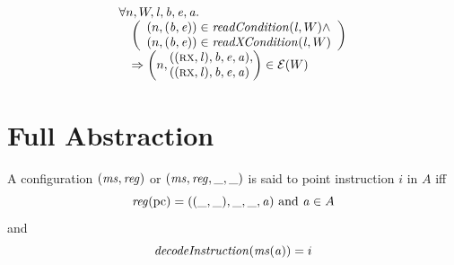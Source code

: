 \documentclass[a4paper]{article}
\begin{document}
\begin{theorem}[FTLR]
  \label{thm:ftlr}
  \[
    \begin{array}{l}
      \forall n,W,\lin,\baddr,\eaddr,\aaddr \ldotp \\
      \quad \left(
      \begin{array}{l}
        \npair{(\baddr,\eaddr)} \in \readCond{\lin,W} \wedge\\
        \npair{(\baddr,\eaddr)} \in \xReadCond{\lin,W}
      \end{array}
      \right)\\
      \quad\Rightarrow 
      \npair{\arraycolsep=0pt\array{l}((\rx,\lin),\baddr,\eaddr,\aaddr),\\
                      ((\rx,\lin),\baddr,\eaddr,\aaddr)\endarray} \in \lre(W)

    \end{array}
  \]
\end{theorem}

\section{Full Abstraction}
\begin{definition}
  \label{def:points-to-instr}
  A configuration $(\mathit{ms},\mathit{reg})$ {\sourcecolor or $(\mathit{ms},\mathit{reg},\_,\_)$} is said to point instruction $i$ in $A$ iff
  \[
    \mathit{reg}(\mathrm{pc}) = ((\_,\_),\_,\_,\mathit{a}) \text{ and } \mathit{a} \in A
  \]
and
\[
  \decInstr{\ms(\aaddr)} = i
\]
\end{definition}
\end{document}
